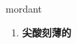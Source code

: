 
\begin{frame}
{\huge mordant}
\begin{center}
\begin{enumerate}\Large
  \item \textbf{尖酸刻薄的}
\end{enumerate}
\end{center}
\end{frame}

